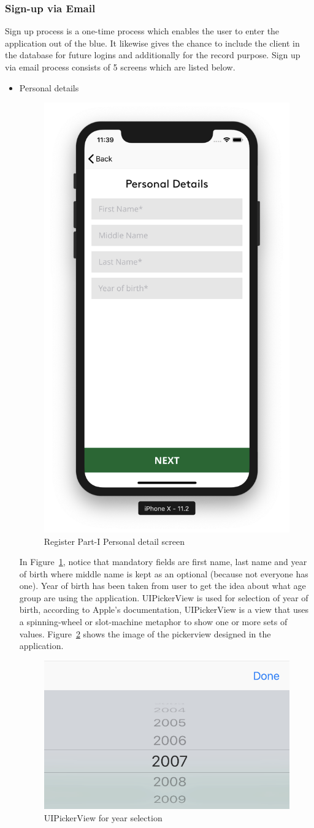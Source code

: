 \subsubsection{Sign-up via Email}

Sign up process is a one-time process which enables the user to enter the application out of the blue. It likewise gives the chance to include the client in the database for future logins and additionally for the record purpose. Sign up via email process consists of 5 screens which are listed below.

\begin{itemize}

    \item Personal details
    
    \begin{figure}[H]
            \centering
            \includegraphics[width=0.25\linewidth]{figures/ch4/register_personal.png}
            \caption{\label{fig:register_personal_ch4} Register Part-I Personal detail screen}
    \end{figure}
    
    In Figure~\ref{fig:register_personal_ch4}, notice that mandatory fields are first name, last name and year of birth where middle name is kept as an optional (because not everyone has one). Year of birth has been taken from user to get the idea about what age group are using the application. UIPickerView is used for selection of year of birth, according to Apple's documentation, UIPickerView is a view that uses a spinning-wheel or slot-machine metaphor to show one or more sets of values. Figure~\ref{fig:pickerview} shows the image of the pickerview designed in the application.
    
    \begin{figure}[H]
            \centering
            \includegraphics[width=0.25\linewidth]{figures/ch4/pickerview.png}
            \caption{\label{fig:pickerview} UIPickerView for year selection}
    \end{figure}
  

\end{itemize}
